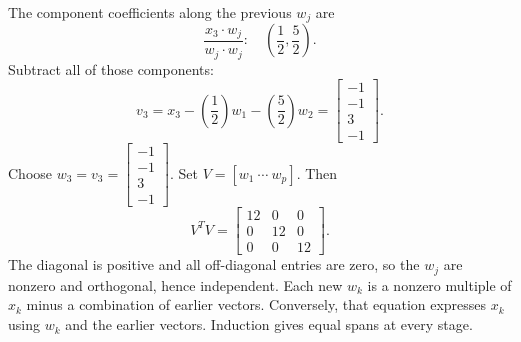 The component coefficients along the previous $w_j$ are
\[\frac{x_{3}\cdot w_j}{w_j\cdot w_j}:\quad(\frac{1}{2},\frac{5}{2}).\]
Subtract all of those components:
\[v_{3}=x_{3}-(\frac{1}{2})w_{1}-(\frac{5}{2})w_{2}=\left[\begin{array}{r}-1\\-1\\3\\-1\end{array}\right].\]
Choose $w_{3}=v_{3}=\left[\begin{array}{r}-1\\-1\\3\\-1\end{array}\right]$.
Set $V=[w_1\ \cdots\ w_p]$. Then
\[V^TV=\left[\begin{array}{rrr}12&0&0\\0&12&0\\0&0&12\end{array}\right].\]
The diagonal is positive and all off-diagonal entries are zero, so the $w_j$ are nonzero and orthogonal, hence independent. Each new $w_k$ is a nonzero multiple of $x_k$ minus a combination of earlier vectors. Conversely, that equation expresses $x_k$ using $w_k$ and the earlier vectors. Induction gives equal spans at every stage.

